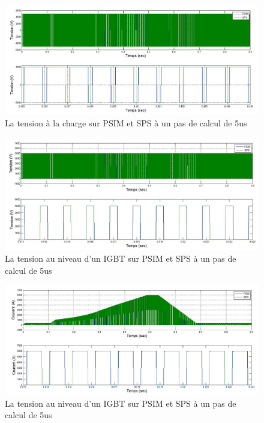 \documentclass[11pt,letterpaper,final]{report}
\begin{document}
\begin{figure}[h!]
\centering
\includegraphics[scale=0.5]{Fig/Hacheur4Quadrants/HacheurTensionCharge5u.jpg}
\caption{La tension à la charge sur PSIM et SPS à un pas de calcul de 5us}
\label{hc_ten_ch_5}
\end{figure}


\begin{figure}[h!]
\centering
\includegraphics[scale=0.5]{Fig/Hacheur4Quadrants/HacheurTensionIGBT5u.jpg}
\caption{La tension au niveau d'un IGBT sur PSIM et SPS à un pas de calcul de 5us}
\label{hc_IG_ten_5}
\end{figure}

\begin{figure}[h!]
\centering
\includegraphics[scale=0.5]{Fig/Hacheur4Quadrants/HacheurCourantIGBT5u.jpg}
\caption{La tension au niveau d'un IGBT sur PSIM et SPS à un pas de calcul de 5us}
\label{hc_IG_cou_5}
\end{figure}
\clearpage
\end{document}
